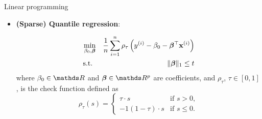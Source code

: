 \documentclass[11pt,compress,t,notes=noshow, xcolor=table]{beamer}
\begin{document}
\begin{vbframe}{Linear programming}





















\begin{itemize}
\item \textbf{(Sparse) Quantile regression}:

\vspace{-\baselineskip}

\begin{eqnarray*}
    \min_{\beta_0,\bm{\beta}} && \frac{1}{n}\sum_{i = 1}^n \rho_\tau \left(y^{(i)} - \beta_0 -  \bm{\beta}^\top\mathbf{x}^{(i)}\right) \\
\text{s.t. } && \|\bm{\beta}\|_1 \le t
\end{eqnarray*}
where $\beta_0 \in \R$ and $\bm{\beta} \in \R^p$ are coefficients, and $\rho_\tau$, $\tau \in [0,1]$, is the check function defined as
\begin{equation*}
    \rho_\tau(s) =
    \begin{cases}
        \tau \cdot s & \text{if } s>0, \\
        -1(1-\tau)\cdot s & \text{if } s\le0.
    \end{cases}
\end{equation*}


\end{itemize}
\end{vbframe}
\end{document}
